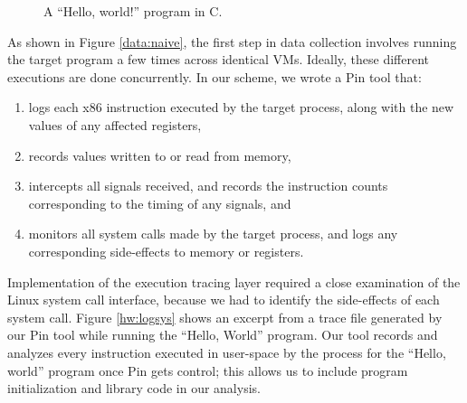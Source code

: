 \begin{figure}[h]
  
  \caption[A ``Hello, world!'' program in C.]%
          {A ``Hello, world!'' program in C. }
          \label{source:hw}
\end{figure}

 \newline
As shown in Figure \ref{data:naive}, the first step
in data collection involves running the target program
a few times across identical VMs. Ideally, these 
different executions are done concurrently. 
In our scheme, we wrote a Pin tool that:
\begin{enumerate}
\item logs each x86 instruction executed by 
  the target process, along with the 
  new values of any affected registers, 
\item records values written to or 
  read from memory,
\item intercepts all signals received, and records the instruction counts 
  corresponding to the timing of any signals, and
\item monitors all system calls made by the target process,
  and logs any corresponding side-effects to memory or registers.
\end{enumerate}

Implementation of the execution tracing layer required
a close examination of the Linux system call interface,
because we had to identify the side-effects of each system call. 
Figure \ref{hw:logsys} shows an excerpt from a trace file
generated by our Pin tool while running the ``Hello, World'' 
program. Our tool records and analyzes
every instruction executed in user-space by the process
for the ``Hello, world'' program once Pin gets control; 
this allows us to include program initialization
and library code in our analysis.

